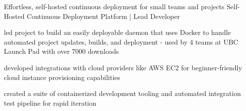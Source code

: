  
\begin{cventries}

  \cventry
    {Effortless, self-hosted continuous deployment for small teams and projects} %
    {Self-Hosted Continuous Deployment Platform | Lead Developer} %
    {} %
    {} %
    {
      \begin{cvitems} %
        \item {led project to build an easily deployable daemon that uses Docker to handle automated project updates, builds, and deployment - used by 4 teams at UBC Launch Pad with over 7000 downloads}
        \item {developed integrations with cloud providers like AWS EC2 for beginner-friendly cloud instance provisioning capabilities}
        \item{created a suite of containerized development tooling and automated integration test pipeline for rapid iteration}
      \end{cvitems}
    }


\end{cventries}
